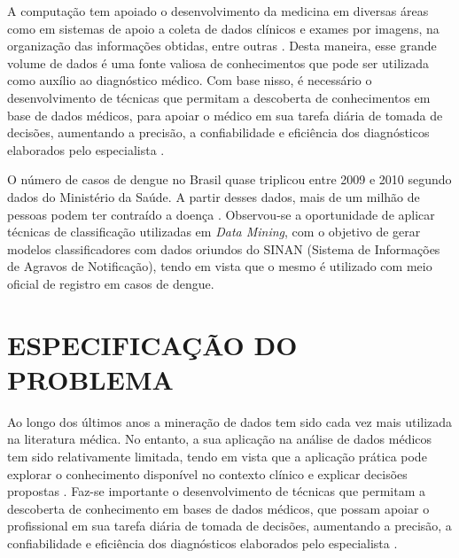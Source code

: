 \documentclass[
	12pt,				%
	openright,			%
	oneside,	
	a4paper,				%
	english,				%
	brazil				%
]{abntex2/abntex2} %
\begin{document}
	A computação tem apoiado o desenvolvimento da medicina em diversas áreas como em sistemas de apoio a coleta de dados clínicos e exames por imagens, na organização das informações obtidas, entre outras \cite{costa:2012}. Desta maneira, esse grande volume de dados é uma fonte valiosa de conhecimentos que pode ser utilizada como auxílio ao diagnóstico médico. Com base nisso, é necessário o desenvolvimento de técnicas que permitam a descoberta de conhecimentos em base de dados médicos, para apoiar o médico em sua tarefa diária de tomada de decisões, aumentando a precisão, a confiabilidade e eficiência dos diagnósticos elaborados pelo especialista \cite{costa:2012}.
	
	O número de casos de dengue no Brasil quase triplicou entre 2009 e 2010 segundo dados do Ministério da Saúde. A partir desses dados, mais de um milhão de pessoas podem ter contraído a doença \cite{santos:2011}. Observou-se a oportunidade de aplicar técnicas de classificação utilizadas em \textit{Data Mining}, com o objetivo de gerar modelos classificadores com dados oriundos do SINAN (Sistema de Informações de Agravos de Notificação), tendo em vista que o mesmo é utilizado com meio oficial de registro em casos de dengue.
    
    \vspace{-1.5\baselineskip}
	
	\section{ESPECIFICAÇÃO DO PROBLEMA}
		
		\vspace{1\baselineskip}

		Ao longo dos últimos anos a mineração de dados tem sido cada vez mais utilizada na literatura médica. No entanto, a sua aplicação na análise de dados médicos tem sido relativamente limitada, tendo em vista que a aplicação prática pode explorar o conhecimento disponível no contexto clínico e explicar decisões propostas \cite{bellazzi:2008}. Faz-se importante o desenvolvimento de técnicas que permitam a descoberta de conhecimento em bases de dados médicos, que possam apoiar o profissional em sua tarefa diária de tomada de decisões, aumentando a precisão, a confiabilidade e eficiência dos diagnósticos elaborados pelo especialista \cite{costa:2012}.
		
\end{document}
